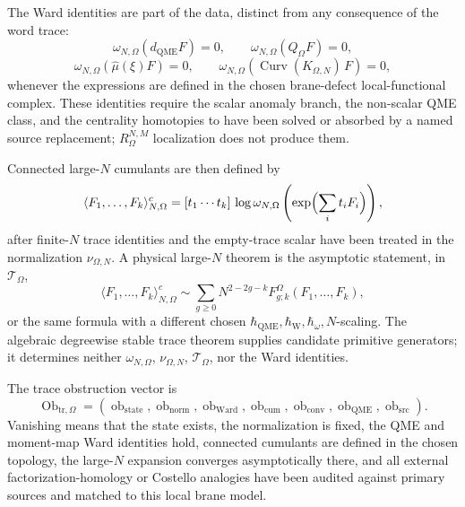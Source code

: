 \begin{enumerate}
  The Ward identities are part of the data, distinct from any
  consequence of the word trace:
  \[
    \omega_{N,\Omega}(d_{\mathrm{QME}}F)=0,\qquad
    \omega_{N,\Omega}(Q_\Omega F)=0,
  \]
  \[
    \omega_{N,\Omega}(\widehat\mu(\xi)F)=0,\qquad
    \omega_{N,\Omega}(\operatorname{Curv}(K_{\Omega,N})\,F)=0,
  \]
  whenever the expressions are defined in the chosen brane-defect
  local-functional complex.  These identities require the scalar
  anomaly branch, the non-scalar QME class, and the centrality
  homotopies to have been solved or absorbed by a named source
  replacement; \(R_\Omega^{N,M}\) localization does not produce them.

  Connected large-\(N\) cumulants are then defined by
  \[
    \langle F_1,\ldots,F_k\rangle^{c}_{N,\Omega}
      =
      [t_1\cdots t_k]\,
      \log\omega_{N,\Omega}
      \left(\exp\Bigl(\sum_i t_iF_i\Bigr)\right),
  \]
  after finite-\(N\) trace identities and the empty-trace scalar have
  been treated in the normalization \(\nu_{\Omega,N}\).  A physical
  large-\(N\) theorem is the asymptotic statement, in
  \(\mathcal T_\Omega\),
  \[
    \langle F_1,\ldots,F_k\rangle^{c}_{N,\Omega}
      \sim
      \sum_{g\ge0}
      N^{2-2g-k}F^{\Omega}_{g;k}(F_1,\ldots,F_k),
  \]
  or the same formula with a different chosen
  \(\hbar_{\mathrm{QME}},\hbar_{\mathrm{W}},\hbar_\omega,N\)-scaling.
  The algebraic degreewise stable trace theorem supplies candidate
  primitive generators; it determines neither \(\omega_{N,\Omega}\),
  \(\nu_{\Omega,N}\), \(\mathcal T_\Omega\), nor the Ward identities.

  The trace obstruction vector is
  \[
    \operatorname{Ob}_{\mathrm{tr},\Omega}
    =
    (\operatorname{ob}_{\mathrm{state}},
     \operatorname{ob}_{\mathrm{norm}},
     \operatorname{ob}_{\mathrm{Ward}},
     \operatorname{ob}_{\mathrm{cum}},
     \operatorname{ob}_{\mathrm{conv}},
     \operatorname{ob}_{\mathrm{QME}},
     \operatorname{ob}_{\mathrm{src}}).
  \]
  Vanishing means that the state exists, the normalization is fixed, the
  QME and moment-map Ward identities hold, connected cumulants are
  defined in the chosen topology, the large-\(N\) expansion converges
  asymptotically there, and all external factorization-homology or
  Costello analogies have been audited against primary sources and
  matched to this local brane model.


\end{enumerate}

